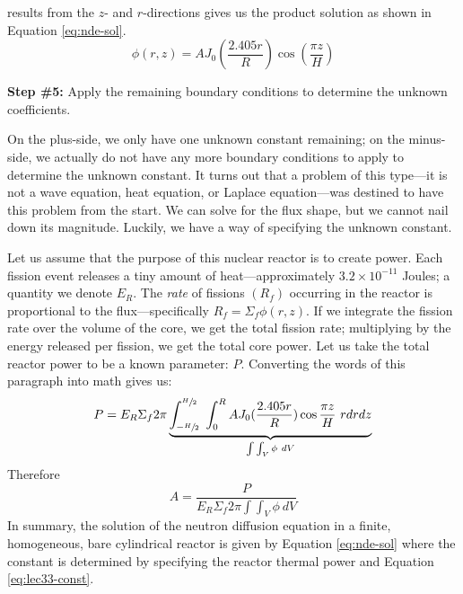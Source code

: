  results from the $z$- and $r$-directions gives us the product solution as shown in Equation \ref{eq:nde-sol}.
\begin{equation}
\phi(r,z) = A J_0(\frac{2.405 r}{R})\cos{(\frac{\pi z}{H})}
\label{eq:nde-sol}
\end{equation}

\vspace{0.25cm}

\noindent\textbf{Step \#5:} Apply the remaining boundary conditions to determine the unknown coefficients.

\vspace{0.25cm}

\noindent On the plus-side, we only have one unknown constant remaining; on the minus-side, we actually do not have any more boundary conditions to apply to determine the unknown constant.  It turns out that a problem of this type---it is not a wave equation, heat equation, or Laplace equation---was destined to have this problem from the start.  We can solve for the flux shape, but we cannot nail down its magnitude.  Luckily, we have a way of specifying the unknown constant.

Let us assume that the purpose of this nuclear reactor is to create power.  Each fission event releases a tiny amount of heat---approximately $3.2\times 10^{-11}$ Joules; a quantity we denote $E_R$. The \emph{rate} of fissions $(R_f)$ occurring in the reactor is proportional to the flux---specifically $R_f = \Sigma_f \phi(r,z)$.  If we integrate the fission rate over the volume of the core, we get the total fission rate; multiplying by the energy released per fission, we get the total core power.  Let us take the total reactor power to be a known parameter: $P$.  Converting the words of this paragraph into math gives us:
\begin{equation}
P = E_R \Sigma_f 2 \pi \underbrace{\int_{-\sfrac{H}{2}}^{\sfrac{H}{2}} \ \int_0^R AJ_0(\frac{2.405 r}{R})\cos{\frac{\pi z}{H}} \ r dr dz}_{\int \int_{V} \phi \ dV}
\end{equation}
Therefore
\begin{equation}
A = \frac{P}{E_R \Sigma_f 2\pi \int \int_{V} \phi \ dV}
\label{eq:lec33-const}
\end{equation}
In summary, the solution of the neutron diffusion equation in a finite, homogeneous, bare cylindrical reactor is given by Equation \ref{eq:nde-sol} where the constant is determined by specifying the reactor thermal power and Equation \ref{eq:lec33-const}.

